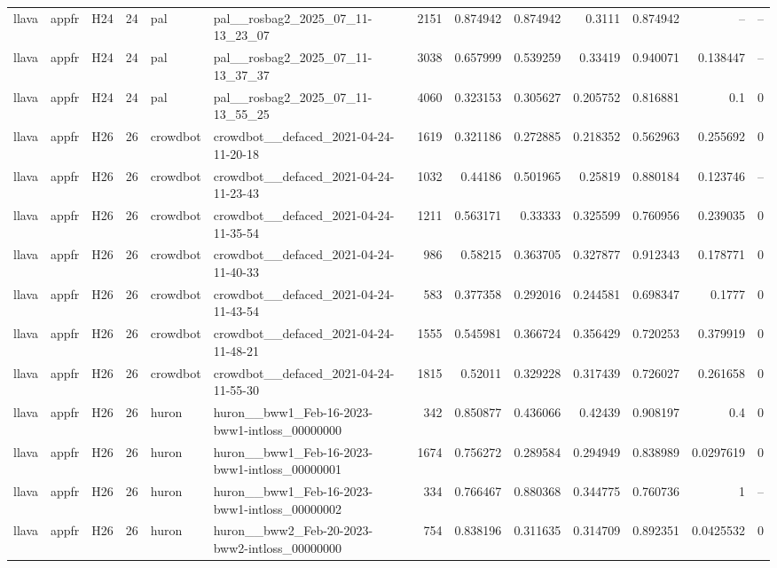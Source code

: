 \begin{longtable}{lllrllrrrrrrr}
llava & appfr & H24 & 24 & pal & pal\_\_rosbag2\_2025\_07\_11-13\_23\_07 & 2151 & 0.874942 & 0.874942 & 0.3111 & 0.874942 & -- & -- \\
llava & appfr & H24 & 24 & pal & pal\_\_rosbag2\_2025\_07\_11-13\_37\_37 & 3038 & 0.657999 & 0.539259 & 0.33419 & 0.940071 & 0.138447 & -- \\
llava & appfr & H24 & 24 & pal & pal\_\_rosbag2\_2025\_07\_11-13\_55\_25 & 4060 & 0.323153 & 0.305627 & 0.205752 & 0.816881 & 0.1 & 0 \\
llava & appfr & H26 & 26 & crowdbot & crowdbot\_\_defaced\_2021-04-24-11-20-18 & 1619 & 0.321186 & 0.272885 & 0.218352 & 0.562963 & 0.255692 & 0 \\
llava & appfr & H26 & 26 & crowdbot & crowdbot\_\_defaced\_2021-04-24-11-23-43 & 1032 & 0.44186 & 0.501965 & 0.25819 & 0.880184 & 0.123746 & -- \\
llava & appfr & H26 & 26 & crowdbot & crowdbot\_\_defaced\_2021-04-24-11-35-54 & 1211 & 0.563171 & 0.33333 & 0.325599 & 0.760956 & 0.239035 & 0 \\
llava & appfr & H26 & 26 & crowdbot & crowdbot\_\_defaced\_2021-04-24-11-40-33 & 986 & 0.58215 & 0.363705 & 0.327877 & 0.912343 & 0.178771 & 0 \\
llava & appfr & H26 & 26 & crowdbot & crowdbot\_\_defaced\_2021-04-24-11-43-54 & 583 & 0.377358 & 0.292016 & 0.244581 & 0.698347 & 0.1777 & 0 \\
llava & appfr & H26 & 26 & crowdbot & crowdbot\_\_defaced\_2021-04-24-11-48-21 & 1555 & 0.545981 & 0.366724 & 0.356429 & 0.720253 & 0.379919 & 0 \\
llava & appfr & H26 & 26 & crowdbot & crowdbot\_\_defaced\_2021-04-24-11-55-30 & 1815 & 0.52011 & 0.329228 & 0.317439 & 0.726027 & 0.261658 & 0 \\
llava & appfr & H26 & 26 & huron & huron\_\_bww1\_Feb-16-2023-bww1-intloss\_00000000 & 342 & 0.850877 & 0.436066 & 0.42439 & 0.908197 & 0.4 & 0 \\
llava & appfr & H26 & 26 & huron & huron\_\_bww1\_Feb-16-2023-bww1-intloss\_00000001 & 1674 & 0.756272 & 0.289584 & 0.294949 & 0.838989 & 0.0297619 & 0 \\
llava & appfr & H26 & 26 & huron & huron\_\_bww1\_Feb-16-2023-bww1-intloss\_00000002 & 334 & 0.766467 & 0.880368 & 0.344775 & 0.760736 & 1 & -- \\
llava & appfr & H26 & 26 & huron & huron\_\_bww2\_Feb-20-2023-bww2-intloss\_00000000 & 754 & 0.838196 & 0.311635 & 0.314709 & 0.892351 & 0.0425532 & 0 \\

\end{longtable}
